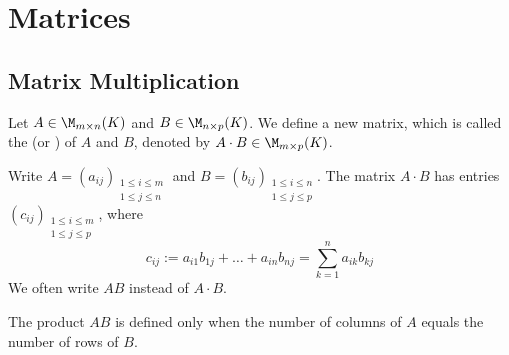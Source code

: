 \renewcommand{\thetheorem}{17.a.\arabic{theorem}}
\setcounter{theorem}{0}
\setcounter{chapter}{16}

\chapter{Matrices}

\section{Matrix Multiplication}
\label{sec:matrix_multiplication}

\begin{definition}
\label{def:matrix_multiplication}
Let $A \in \M_{m \times n}(K)$ and $B \in \M_{n \times p}(K)$. We define a new matrix, which is called the  (or ) of $A$ and $B$, denoted by $A \cdot B \in \M_{m \times p}(K)$.

Write $A = (a_{ij})_{\substack{1 \le i \le m \\ 1 \le j \le n}}$ and $B = (b_{ij})_{\substack{1 \le i \le n \\ 1 \le j \le p}}$. The matrix $A \cdot B$ has entries $(c_{ij})_{\substack{1 \le i \le m \\ 1 \le j \le p}}$, where
\begin{equation*}
    c_{ij} := a_{i1}b_{1j} + \dots + a_{in}b_{nj} = \sum_{k=1}^{n} a_{ik}b_{kj}
\end{equation*}
We often write $AB$ instead of $A \cdot B$. 
\end{definition}

\begin{importantremark}
The product $AB$ is defined only when the number of columns of $A$ equals the number of rows of $B$.
\end{importantremark}

